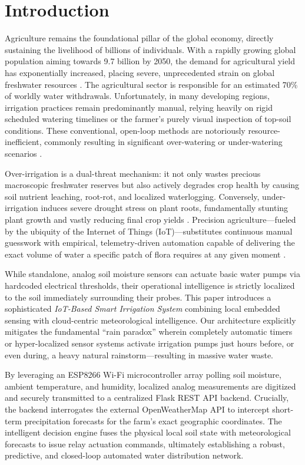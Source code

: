 \documentclass[conference]{IEEEtran}
\begin{document}
\section{Introduction}

Agriculture remains the foundational pillar of the global economy, directly sustaining the livelihood of billions of individuals. With a rapidly growing global population aiming towards 9.7 billion by 2050, the demand for agricultural yield has exponentially increased, placing severe, unprecedented strain on global freshwater resources \cite{b1}. The agricultural sector is responsible for an estimated 70\% of worldly water withdrawals. Unfortunately, in many developing regions, irrigation practices remain predominantly manual, relying heavily on rigid scheduled watering timelines or the farmer's purely visual inspection of top-soil conditions. These conventional, open-loop methods are notoriously resource-inefficient, commonly resulting in significant over-watering or under-watering scenarios \cite{b2}.

Over-irrigation is a dual-threat mechanism: it not only wastes precious macroscopic freshwater reserves but also actively degrades crop health by causing soil nutrient leaching, root-rot, and localized waterlogging. Conversely, under-irrigation induces severe drought stress on plant roots, fundamentally stunting plant growth and vastly reducing final crop yields \cite{b3}. Precision agriculture---fueled by the ubiquity of the Internet of Things (IoT)---substitutes continuous manual guesswork with empirical, telemetry-driven automation capable of delivering the exact volume of water a specific patch of flora requires at any given moment \cite{b4}. 

While standalone, analog soil moisture sensors can actuate basic water pumps via hardcoded electrical thresholds, their operational intelligence is strictly localized to the soil immediately surrounding their probes. This paper introduces a sophisticated \textit{IoT-Based Smart Irrigation System} combining local embedded sensing with cloud-centric meteorological intelligence. Our architecture explicitly mitigates the fundamental ``rain paradox'' wherein completely automatic timers or hyper-localized sensor systems activate irrigation pumps just hours before, or even during, a heavy natural rainstorm—resulting in massive water waste.

By leveraging an ESP8266 Wi-Fi microcontroller array polling soil moisture, ambient temperature, and humidity, localized analog measurements are digitized and securely transmitted to a centralized Flask REST API backend. Crucially, the backend interrogates the external OpenWeatherMap API to intercept short-term precipitation forecasts for the farm's exact geographic coordinates. The intelligent decision engine fuses the physical local soil state with meteorological forecasts to issue relay actuation commands, ultimately establishing a robust, predictive, and closed-loop automated water distribution network. 
\end{document}
